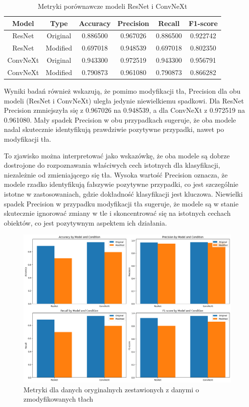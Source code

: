 \begin{table}
	\centering
	\begin{tabular}{|c|c|c|c|c|c|}
		\hline
		\textbf{Model} & \textbf{Type} & \textbf{Accuracy} & \textbf{Precision} & \textbf{Recall} & \textbf{F1-score} \\
		\hline
		ResNet & Original & 0.886500 & 0.967026 & 0.886500 & 0.922742 \\
		\hline
		ResNet & Modified & 0.697018 & 0.948539 & 0.697018 & 0.802350 \\
		\hline
		ConvNeXt & Original & 0.943300 & 0.972519 & 0.943300 & 0.956791 \\
		\hline
		ConvNeXt & Modified & 0.790873 & 0.961080 & 0.790873 & 0.866282 \\
		\hline
	\end{tabular}
	\caption{Metryki porównawcze modeli ResNet i ConvNeXt}
	\label{tab:model_comparison_metrics}
\end{table}

Wyniki badań również wskazują, że pomimo modyfikacji tła, Precision dla obu modeli (ResNet i ConvNeXt) uległa jedynie niewielkiemu spadkowi. 
Dla ResNet Precision zmniejszyła się z 0.967026 na 0.948539, a dla ConvNeXt z 0.972519 na 0.961080. Mały spadek Precision w obu przypadkach 
sugeruje, że oba modele nadal skutecznie identyfikują prawdziwie pozytywne przypadki, nawet po modyfikacji tła.

To zjawisko można interpretować jako wskazówkę, że oba modele są dobrze dostrojone do rozpoznawania właściwych cech istotnych dla klasyfikacji, 
niezależnie od zmieniającego się tła. Wysoka wartość Precision oznacza, że modele rzadko identyfikują fałszywie pozytywne przypadki, co jest 
szczególnie istotne w zastosowaniach, gdzie dokładność klasyfikacji jest kluczowa. Niewielki spadek Precision w przypadku modyfikacji tła 
sugeruje, że modele są w stanie skutecznie ignorować zmiany w tle i skoncentrować się na istotnych cechach obiektów, co jest pozytywnym aspektem 
ich działania.
\begin{figure}
	\centering\includegraphics[width=.9\textwidth]{img/overall_metrics}
	\caption{Metryki dla danych oryginalnych zestawionych z danymi o zmodyfikowanych tłach}  
    \label{rys:overall_metrics}
\end{figure}


